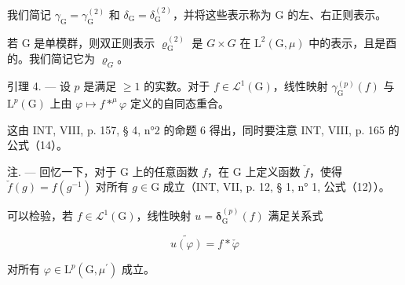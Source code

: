我们简记 \(\gamma_{\mathrm{G}} = \gamma_{\mathrm{G}}^{(2)}\) 和 \(\delta_{\mathrm{G}} = \delta_{\mathrm{G}}^{(2)}\)，并将这些表示称为 G 的左、右正则表示。

若 G 是单模群，则双正则表示 \(\varrho_{\mathrm{G}}^{(2)}\) 是 \(G \times G\) 在 \(\mathrm{L}^{2}(\mathrm{G}, \mu)\) 中的表示，且是酉的。我们简记它为 \(\varrho_{G}\)。

引理 4. --- 设 \(p\) 是满足 \(\geqslant 1\) 的实数。对于 \(f \in \mathcal{L}^1(\mathrm{G})\)，线性映射 \(\gamma_{\mathrm{G}}^{(p)}(f)\) 与 \(\mathrm{L}^p(\mathrm{G})\) 上由 \(\varphi \mapsto f *^\mu \varphi\) 定义的自同态重合。

这由 INT, VIII, p. 157, § 4, n°2 的命题 6 得出，同时要注意 INT, VIII, p. 165 的公式（14）。

注. --- 回忆一下，对于 G 上的任意函数 \(f\)，在 G 上定义函数 \(\check{f}\)，使得 \(\check{f}(g) = f(g^{-1})\) 对所有 \(g \in \mathrm{G}\) 成立（INT, VII, p. 12, § 1, n° 1, 公式（12））。

可以检验，若 \(f \in \mathcal{L}^{1}(\mathrm{G})\)，线性映射 \(u = \boldsymbol{\delta}_{\mathrm{G}}^{(p)}(f)\) 满足关系式

\[
\widetilde {u (\varphi)} = f * \check {\varphi}
\]

对所有 \(\varphi\in\mathrm{L}^{p}(\mathrm{G},\mu^{\prime})\) 成立。
\relax{}
